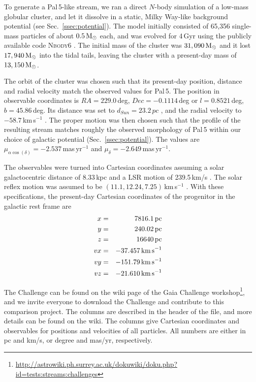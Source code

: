 To generate a Pal\,5-like stream, we ran a direct $N$-body simulation of a low-mass globular cluster, and let it dissolve in a static, Milky Way-like background potential (see Sec.~\ref{ssec:potential}). The model initially consisted of 65,356 single-mass particles of about $0.5\mbox{$\,{\rm M}_\odot$}$ each, and was evolved for 4\,Gyr using the publicly available code \textsc{Nbody6} \citep{Aarseth03, Nitadori12}. The initial mass of the cluster was $31,090\mbox{$\,{\rm M}_\odot$}$ and it lost $17,940\mbox{$\,{\rm M}_\odot$}$ into the tidal tails, leaving the cluster with a present-day mass of $13,150\mbox{$\,{\rm M}_\odot$}$.

The orbit of the cluster was chosen such that its present-day position, distance and radial velocity match the observed values for Pal\,5. The position in observable coordinates is $RA = 229.0$\,deg, $Dec = -0.1114$\,deg or $l = 0.8521$\,deg, $b = 45.86$\,deg. Its distance was set to $d_{Sun} = 23.2\,pc$ \citep{Harris96}, and the radial velocity to $-58.7$\,km\,s$^{-1}$ \citep{Odenkirchen02}. The proper motion was then chosen such that the profile of the resulting stream matches roughly the observed morphology of Pal\,5 within our choice of galactic potential (Sec.~\ref{ssec:potential}). The values are $\mu_{\alpha\cos(\delta)}=-2.537$\,mas\,yr$^{-1}$ and $\mu_\delta = -2.649$\,mas\,yr$^{-1}$.

The observables were turned into Cartesian coordinates assuming a solar galactocentric distance of 8.33\,kpc and a LSR motion of 239.5\,km/s \citep{Gillessen09}. The solar reflex motion was assumed to be $(11.1, 12.24, 7.25)$\,km\,s$^{-1}$ \citep{Schonrich10}. With these specifications, the present-day Cartesian coordinates of the progenitor in the galactic rest frame are 
\begin{eqnarray}
  x &=& 7816.1\,\mbox{pc}\\
  y &=& 240.02\,\mbox{pc}\\
  z &=& 16640\,\mbox{pc}\\
  vx &=& -37.457\,\mbox{km\,s}^{-1}\\
  vy &=& -151.79\,\mbox{km\,s}^{-1}\\
  vz &=& -21.610\,\mbox{km\,s}^{-1}
\end{eqnarray}

The Challenge can be found on the wiki page of the Gaia Challenge workshop\footnote{\url{http://astrowiki.ph.surrey.ac.uk/dokuwiki/doku.php?id=tests:streams:challenges}}, and we invite everyone to download the Challenge and contribute to this comparison project. The columns are described in the header of the file, and more details can be found on the wiki. The columns give Cartesian coordinates and observables for positions and velocities of all particles. All numbers are either in pc and km/s, or degree and mas/yr, respectively. 



